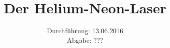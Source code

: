 

\subject{Versuch 61}
\title{Der Helium-Neon-Laser}
\date{Durchführung: 13.06.2016\\
      Abgabe: ???}



\maketitle
\newpage







\printbibliography


